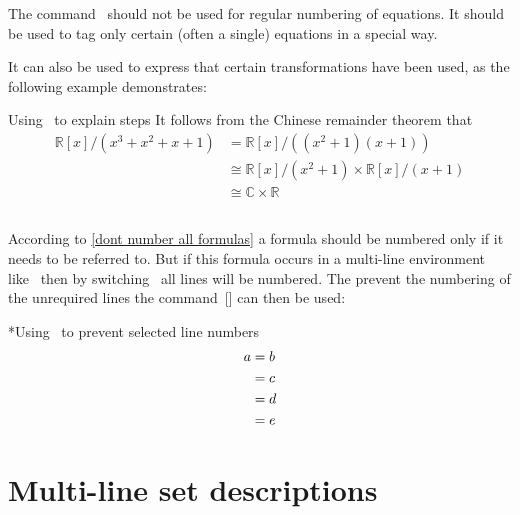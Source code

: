 The command~ should not be used for regular numbering of equations.
It should be used to tag only certain (often a single) equations in a special way.

It can also be used to express that certain transformations have been used, as the following example demonstrates:
\begin{showlatex}{Using~ to explain steps}
It follows from the Chinese remainder theorem that
\begin{align*}
  \mathbb{R}[x] / ( x^3 + x^2 + x + 1 )
  &=
  \mathbb{R}[x] / ( (x^2 + 1) (x + 1) )
  \\
  &\cong
  \mathbb{R}[x] / ( x^2 + 1 ) \times \mathbb{R}[x] / ( x + 1 )
  \tag{CRT}
  \\
  &\cong
  \mathbb{C} \times \mathbb{R}
\end{align*}
\end{showlatex}



\subsection{}

According to \cref{dont number all formulas} a formula should be numbered only if it needs to be referred to.
But if this formula occurs in a multi-line environment like~ then by switching~ all lines will be numbered.
The prevent the numbering of the unrequired lines the command~[\comname] can then be used:
\begin{showlatex}*{Using~ to prevent selected line numbers}
\begin{align}
  a
  &= b \notag \\
  &= c \\
  &= d \notag \\
  &= e
\end{align}
\end{showlatex}





\section{Multi-line set descriptions}

